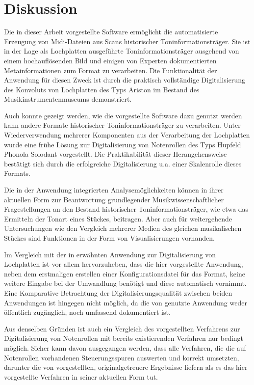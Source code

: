 \section{Diskussion}

Die in dieser Arbeit vorgestellte Software ermöglicht die automatisierte Erzeugung von Midi-Dateien aus Scans historischer Toninformationsträger.
Sie ist in der Lage als Lochplatten ausgeführte Toninformationsträger ausgehend von einem hochauflösenden Bild und einigen von Experten dokumentierten Metainformationen zum Format zu verarbeiten.
Die Funktionalität der Anwendung für diesen Zweck ist durch die praktisch vollständige Digitalisierung des Konvoluts von Lochplatten des Typs Ariston im Bestand des Musikinstrumentenmuseums demonstriert.

Auch konnte gezeigt werden, wie die vorgestellte Software dazu genutzt werden kann andere Formate historischer Toninformationsträger zu verarbeiten.
Unter Wiederverwendung mehrerer Komponenten aus der Verarbeitung der Lochplatten wurde eine frühe Lösung zur Digitalisierung von Notenrollen des Typs Hupfeld Phonola Solodant vorgestellt.
Die Praktikabilität dieser Herangehensweise bestätigt sich durch die erfolgreiche Digitalisierung u.a. einer Skalenrolle dieses Formats. 

Die in der Anwendung integrierten Analysemöglichkeiten können in ihrer aktuellen Form zur Beantwortung grundlegender Musikwissenschaftlicher Fragestellungen an den Bestand historischer Toninformationsträger, wie etwa das Ermitteln der Tonart eines Stückes, beitragen.
Aber auch für weitergehende Untersuchungen wie den Vergleich mehrerer Medien des gleichen musikalischen Stückes sind Funktionen in der Form von Visualisierungen vorhanden.

Im Vergleich mit der in \textcite[]{perretti_2014} erwähnten Anwendung zur Digitalisierung von Lochplatten ist vor allem hervorzuheben, dass die hier vorgestellte Anwendung, neben dem erstmaligen erstellen einer Konfigurationsdatei für das Format, keine weitere Eingabe bei der Umwandlung benötigt und diese automatisch vornimmt.
Eine Komparative Betrachtung der Digitalisierungsqualität zwischen beiden Anwendungen ist hingegen nicht möglich, da die von \textcite[]{perretti_2014} genutzte Anwendung weder öffentlich zugänglich, noch umfassend dokumentiert ist.

Aus denselben Gründen ist auch ein Vergleich des vorgestellten Verfahrens zur Digitalisierung von Notenrollen mit bereits existierenden Verfahren nur bedingt möglich.
Sicher kann davon ausgegangen werden, dass alle Verfahren, die die auf Notenrollen vorhandenen Steuerungsspuren auswerten und korrekt umsetzten, darunter die von \textcite[]{shi_2019, zoltan_1994, colmenares_2011} vorgestellten, originalgetreuere Ergebnisse liefern als es das hier vorgestellte Verfahren in seiner aktuellen Form tut.

